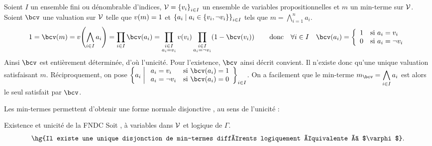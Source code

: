 \documentclass[a4paper,french,bookmarks]{book}
\begin{document}
    \begin{nproof}
        Soient $I$ un ensemble fini ou dénombrable d'indices, $\mathcal{V} = \left\{v_i\right\}_{i \in I}$ un ensemble de variables propositionnelles et $m$ un min-terme sur $\mathcal{V}$. Soient $\bcv$ une valuation sur $\mathcal{V}$ telle que $v\!\left(m\right) = 1$ et $\left\{a_i \;\middle\vert\; a_i \in \left\{v_i, \neg v_i\right\}\right\}_{i \in I}$ tels que $m = \displaystyle\bigwedge_{i=1}^n a_i$.
        \[ 1 = \bcv\p{m} = v\p{\bigwedge_{i \in I} a_i} = \prod_{i \in I} \bcv\p{a_i} = \prod_{\substack{i \in I\\a_i = v_i}} v\p{v_i} \prod_{\substack{i \in I\\a_i = \neg v_i}} \p{1 - \bcv\p{v_i}} \qquad\text{donc}\quad \forall i \in I\quad \bcv\p{a_i} = \left\lbrace\begin{array}{ll}
            1 &\text{si} \ a_i = v_i  \\
            0 &\text{si} \ a_i = \neg v_i 
        \end{array}\right.\]
        Ainsi $\bcv$ est entièrement déterminée, d'où l'unicité. Pour l'existence, $\bcv$ ainsi décrit convient. Il n'existe donc qu'une unique valuation satisfaisant $m$. Réciproquement, on pose $\ens{a_i \enstq \begin{array}{ll}
            a_i = v_i &\text{si} \ \bcv\p{a_i} = 1  \\
            a_i = \neg v_i &\text{si} \ \bcv\p{a_i} = 0 
        \end{array}}_{i \in I}$. On a facilement que le min-terme $m_\bcv = \displaystyle\bigwedge_{i \in I} a_i$ est alors le seul satisfait par $\bcv$. 
    \end{nproof}
    Les min-termes permettent d'obtenir une forme normale disjonctive , au sens de l'unicité :
    \begin{corollary}{Existence et unicité de la FNDC}{}
        Soit ,  à variables dans $\mathcal{V}$ et  logique de $\Gamma$.
        \[ \text{\hg{Il existe une unique disjonction de min-termes différents logiquement équivalente à $\varphi$}.} \]
    \end{corollary}
\end{document}
